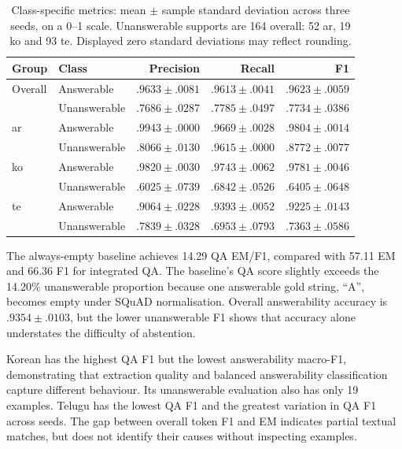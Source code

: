 \documentclass[11pt,a4paper]{article}
\begin{document}
\begin{table}[t]
\centering
\small
\setlength{\tabcolsep}{5pt}
\begin{tabular}{llrrr}
\toprule
Group & Class & Precision & Recall & F1 \\
\midrule
Overall & Answerable
& $.9633\pm.0081$ & $.9613\pm.0041$ & $.9623\pm.0059$ \\
        & Unanswerable
& $.7686\pm.0287$ & $.7785\pm.0497$ & $.7734\pm.0386$ \\
\midrule
ar & Answerable
& $.9943\pm.0000$ & $.9669\pm.0028$ & $.9804\pm.0014$ \\
   & Unanswerable
& $.8066\pm.0130$ & $.9615\pm.0000$ & $.8772\pm.0077$ \\
\midrule
ko & Answerable
& $.9820\pm.0030$ & $.9743\pm.0062$ & $.9781\pm.0046$ \\
   & Unanswerable
& $.6025\pm.0739$ & $.6842\pm.0526$ & $.6405\pm.0648$ \\
\midrule
te & Answerable
& $.9064\pm.0228$ & $.9393\pm.0052$ & $.9225\pm.0143$ \\
   & Unanswerable
& $.7839\pm.0328$ & $.6953\pm.0793$ & $.7363\pm.0586$ \\
\bottomrule
\end{tabular}
\caption{Class-specific metrics: mean $\pm$ sample standard
deviation across three seeds, on a 0--1 scale.
Unanswerable supports are 164 overall: 52 ar, 19 ko and 93 te.
Displayed zero standard deviations may reflect rounding.}
\label{tab:qa_class_metrics}
\end{table}

The always-empty baseline achieves 14.29 QA EM/F1, compared
with 57.11 EM and 66.36 F1 for integrated QA.
The baseline's QA score slightly exceeds the 14.20\%
unanswerable proportion because one answerable gold string,
``A'', becomes empty under SQuAD normalisation.
Overall answerability accuracy is $.9354\pm.0103$,
but the lower unanswerable F1 shows that accuracy alone
understates the difficulty of abstention.

Korean has the highest QA F1 but the lowest answerability
macro-F1, demonstrating that extraction quality and balanced
answerability classification capture different behaviour.
Its unanswerable evaluation also has only 19 examples.
Telugu has the lowest QA F1 and the greatest variation in
QA F1 across seeds. The gap between overall token F1 and EM
indicates partial textual matches, but does not identify
their causes without inspecting examples.
\end{document}
